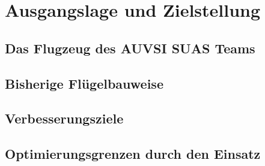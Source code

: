 \chapter{Ausgangslage und Zielstellung}\label{cha:Ausgangslage und Zielstellung}

\section{Das Flugzeug des AUVSI SUAS Teams}


\section{Bisherige Flügelbauweise}


\section{Verbesserungsziele}

\section{Optimierungsgrenzen durch den Einsatz}